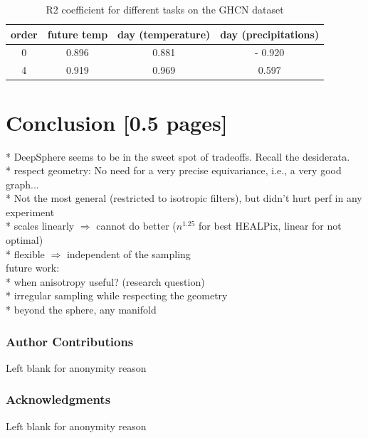 \documentclass{article} %
\begin{document}
\begin{table}
    \centering
    \begin{tabular}{c|ccc}
        order & future temp & day (temperature) & day (precipitations) \\ \hline
        0 & 0.896 & 0.881 & - 0.920\\
        4 & 0.919 & 0.969 & 0.597\\
    \end{tabular}
    \caption{R2 coefficient for different tasks on the GHCN dataset}
    \label{tab:GHCN_results}
\end{table}



\section{Conclusion [0.5 pages]}

* DeepSphere seems to be in the sweet spot of tradeoffs. Recall the desiderata.\\
  * respect geometry: No need for a very precise equivariance, i.e., a very good graph...\\
  * Not the most general (restricted to isotropic filters), but didn't hurt perf in any experiment\\
  * scales linearly $\Rightarrow$ cannot do better ($n^{1.25}$ for best HEALPix, linear for not optimal)\\
  * flexible $\Rightarrow$ independent of the sampling\\

future work:\\
* when anisotropy useful? (research question)\\
* irregular sampling while respecting the geometry\\
* beyond the sphere, any manifold\\

\newpage
\subsubsection*{Author Contributions}
Left blank for anonymity reason

\subsubsection*{Acknowledgments}
Left blank for anonymity reason
\end{document}
